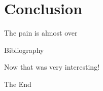 \documentclass[10pt]{beamer}
\begin{document}
\section{Conclusion}
\begin{frame}{The pain is almost over}
\end{frame}
\begin{frame}{Bibliography}
\end{frame}
\endgroup

\begingroup
{}
\begin{frame}[plain,c]
\hspace*{6 mm}
\vspace*{-18 mm}
\textcolor{blue_light}{\Large{Now that was very interesting!}}
\end{frame}
\begin{frame}[plain,c]
\hspace*{27 mm}
\vspace*{-20 mm}
\textcolor{blue_light}{\Large{The End}}
\end{frame}
\endgroup
\end{document}
